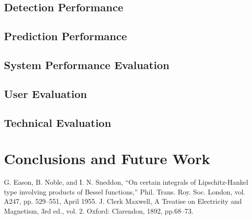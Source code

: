 \documentclass[conference]{IEEEtran}
\begin{document}
\subsection{Detection Performance}



\subsection{Prediction Performance}


\subsection{System Performance Evaluation}



\subsection{User Evaluation}



\subsection{Technical Evaluation}


\section{Conclusions and Future Work}

\begin{thebibliography}{00}
 G. Eason, B. Noble, and I. N. Sneddon, ``On certain integrals of Lipschitz-Hankel type involving products of Bessel functions,'' Phil. Trans. Roy. Soc. London, vol. A247, pp. 529--551, April 1955.
 J. Clerk Maxwell, A Treatise on Electricity and Magnetism, 3rd ed., vol. 2. Oxford: Clarendon, 1892, pp.68--73.
\end{thebibliography}
\end{document}
